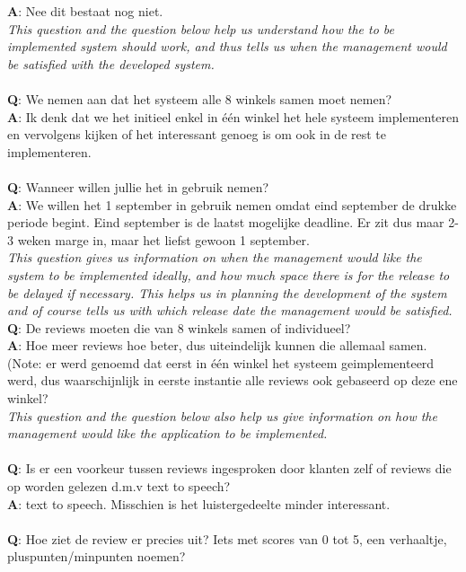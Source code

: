 \documentclass[a4paper]{article}
\begin{document}
\textbf{A}: Nee dit bestaat nog niet.\\
\textit{This question and the question below help us understand how the to be implemented system should work, and thus tells us when the management would be satisfied with the developed system.}\\
\\
\textbf{Q}: We nemen aan dat het systeem alle 8 winkels samen moet nemen?\\
\textbf{A}: Ik denk dat we het initieel enkel in één winkel het hele systeem implementeren en vervolgens kijken of het interessant genoeg is om ook in de rest te implementeren.\\
\\
\textbf{Q}: Wanneer willen jullie het in gebruik nemen?\\
\textbf{A}: We willen het 1 september in gebruik nemen omdat eind september de drukke periode begint. Eind september is de laatst mogelijke deadline. Er zit dus maar 2-3 weken marge in, maar het liefst gewoon 1 september.\\
\textit{This question gives us information on when the management would like the system to be implemented ideally, and how much space there is for the release to be delayed if necessary. This helps us in planning the development of the system and of course tells us with which release date the management would be satisfied. }
\\
\textbf{Q}: De reviews moeten die van 8 winkels samen of individueel?\\
\textbf{A}: Hoe meer reviews hoe beter, dus uiteindelijk kunnen die allemaal samen. (Note: er werd genoemd dat eerst in één winkel het systeem geimplementeerd werd, dus waarschijnlijk in eerste instantie alle reviews ook gebaseerd op deze ene winkel?\\
\textit{This question and the question below also help us give information on how the management would like the application to be implemented.}\\
\\
\textbf{Q}: Is er een voorkeur tussen reviews ingesproken door klanten zelf of reviews die op worden gelezen d.m.v text to speech?\\
\textbf{A}: text to speech. Misschien is het luistergedeelte minder interessant.\\
\\
\textbf{Q}: Hoe ziet de review er precies uit? Iets met scores van 0 tot 5, een verhaaltje, pluspunten/minpunten noemen? \\
\end{document}
